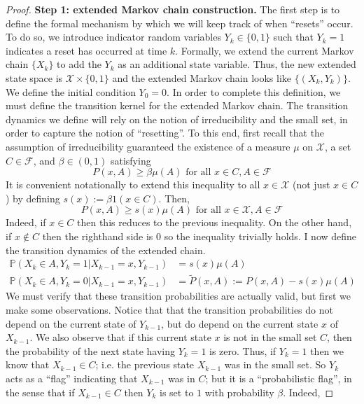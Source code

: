 \documentclass[12pt]{article}
\newcommand{\Prob}{\mathbb{P}}
\begin{document}
\begin{proof} 
\noindent
\textbf{Step 1: extended Markov chain construction.} The first step is to define the formal mechanism by which we will keep track of when ``resets'' occur. To do so, we introduce 
indicator random variables $Y_k \in \{0, 1\}$ such that $Y_k = 1$ indicates a reset has occurred at time $k$. Formally, we extend the current Markov chain $\{X_k\}$ to add the $Y_k$ as an 
additional state variable. Thus, the new extended state space is $\mathcal{X} \times \{0, 1\}$ and the extended Markov chain looks like $\{(X_k, Y_k)\}$. We define the initial condition 
$Y_0 = 0$. In order to complete this definition, we 
must define the transition kernel for the extended Markov chain. The transition dynamics we define will rely on the notion of irreducibility and the small set, in order to capture the notion of 
``resetting''. To this end, first recall that the assumption of irreducibility guaranteed the existence of a measure $\mu$ on $\mathcal{X}$, a set $C \in \mathcal{F}$, and 
$\beta \in (0, 1)$ satisfying 
\[P(x, A) \geq \beta \mu(A) \text{ for all } x \in C, A \in \mathcal{F} \]
It is convenient notationally to extend this inequality to all $x \in \mathcal{X}$ (not just $x \in C$) by defining $s(x) := \beta 1(x \in C)$. Then, 
\[P(x, A) \geq s(x)\mu(A) \text{ for all } x \in \mathcal{X}, A \in \mathcal{F} \]
Indeed, if $x \in C$ then this reduces to the previous inequality. On the other hand, if $x \notin C$ then the righthand side is $0$ so the inequality trivially holds. I now define the transition dynamics 
of the extended chain. 
\begin{align*}
\Prob(X_k \in A, Y_k = 1|X_{k-1} = x, Y_{k-1}) &= s(x)\mu(A) \\
\Prob(X_k \in A, Y_k = 0|X_{k-1} = x, Y_{k-1}) &= \tilde{P}(x, A) := P(x, A) - s(x) \mu(A) 
\end{align*} 
We must verify that these transition probabilities are actually valid, but first we make some observations. Notice that that the transition probabilities do not depend on the current 
state of $Y_{k-1}$, but do depend on the current state $x$ of $X_{k-1} $. We also observe that if this current state $x$ is not in the small set $C$, then the probability of the next state having 
$Y_{k} = 1$ is zero. Thus, if $Y_{k} = 1$ then we know that $X_{k-1} \in C$; i.e. the previous state $X_{k-1}$ was in the small set. So $Y_{k}$ acts as a ``flag'' indicating that 
$X_{k-1}$ was in $C$; but it is a ``probabilistic flag'', in the sense that if $X_{k-1} \in C$ then $Y_k$ is set to $1$ with probability $\beta$. Indeed, 

\end{proof}
\end{document}
